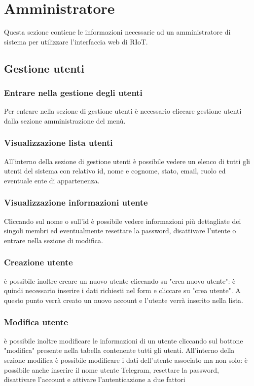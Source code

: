\section{Amministratore}
Questa sezione contiene le informazioni necessarie ad un amministratore di sistema per utilizzare l'interfaccia web di RIoT.

\subsection{Gestione utenti}

	\subsubsection{Entrare nella gestione degli utenti}
		Per entrare nella sezione di gestione utenti è necessario cliccare gestione utenti dalla sezione amministrazione del menù. 

	\subsubsection{Visualizzazione lista utenti}	
		All'interno della sezione di gestione utenti è possibile vedere un elenco di tutti gli utenti del sistema con relativo id, nome e cognome, stato, email, ruolo ed eventuale ente di appartenenza. 

	\subsubsection{Visualizzazione informazioni utente}	
		Cliccando sul nome o sull'id è possibile vedere informazioni più dettagliate dei singoli membri ed eventualmente resettare la password, disattivare l'utente o entrare nella sezione di modifica.

	\subsubsection{Creazione utente}

		è possibile inoltre creare un nuovo utente cliccando su "crea nuovo utente": è quindi necessario inserire i dati richiesti nel form e cliccare su "crea utente". A questo punto verrà creato un nuovo account e l'utente verrà inserito nella lista.

	\subsubsection{Modifica utente}
		è possibile inoltre modificare le informazioni di un utente cliccando sul bottone "modifica" presente nella tabella contenente tutti gli utenti. All'interno della sezione modifica è possibile modificare i dati dell'utente associato ma non solo: è possibile anche inserire il nome utente Telegram, resettare la password, disattivare l'account e attivare l'autenticazione a due fattori

